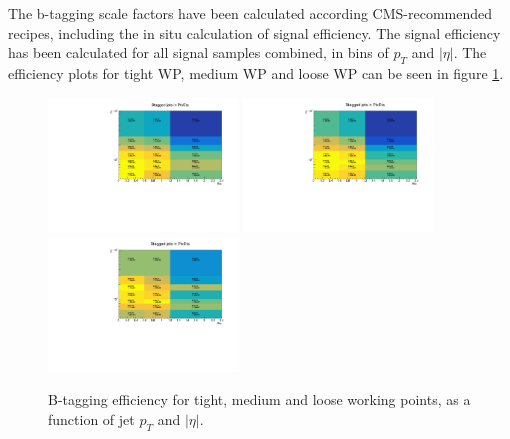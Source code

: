 The b-tagging scale factors have been calculated according CMS-recommended recipes, including the in situ calculation of signal efficiency.
The signal efficiency has been calculated for all signal samples combined, in bins of $p_{T}$ and $|\eta|$.
The efficiency plots for tight WP, medium WP and loose WP can be seen in figure \ref{fig:btageff}.

\begin{figure}[h]
  \centering
  \includegraphics[trim={0 0 0 0.95cm},clip,width=0.45\textwidth]{figures/sec-jets/btageff_tight.pdf}
  \includegraphics[trim={0 0 0 0.95cm},clip,width=0.45\textwidth]{figures/sec-jets/btageff_medium.pdf}
  \includegraphics[trim={0 0 0 0.95cm},clip,width=0.45\textwidth]{figures/sec-jets/btageff_loose.pdf}
  \caption{B-tagging efficiency for tight, medium and loose working points, as a function of jet $p_{T}$ and $|\eta|$.}
  \label{fig:btageff}
\end{figure}

